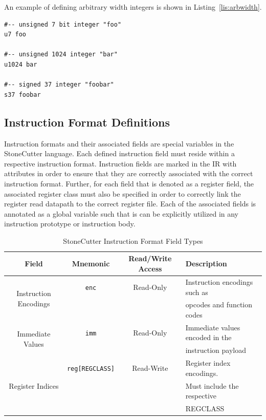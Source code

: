 \documentclass{article}
\begin{document}
An example of defining arbitrary width integers is shown in Listing~\ref{lis:arbwidth}.  

\vspace{0.125in}
\begin{lstlisting}[frame=single,style=base,caption={Arbitrary Width Datatypes},captionpos=b,label={lis:arbwidth}]
#-- unsigned 7 bit integer "foo"
u7 foo

#-- unsigned 1024 integer "bar"
u1024 bar

#-- signed 37 integer "foobar"
s37 foobar
\end{lstlisting}

\clearpage
\subsection{Instruction Format Definitions}
\label{sec:InstFormatDef}

Instruction formats and their associated fields are special variables in the StoneCutter language.  Each defined 
instruction field must reside within a respective instruction format.  Instruction fields are marked in the IR with 
attributes in order to ensure that they are correctly associated with the correct instruction format.  Further, for each 
field that is denoted as a register field, the associated register class must also be specified in order to correctly 
link the register read datapath to the correct register file.  Each of the associated fields is annotated as a global 
variable such that is can be explicitly utilized in any instruction prototype or instruction body.  

\begin{table}[h]
\begin{center}
\caption{StoneCutter Instruction Format Field Types}
\vspace{0.125in}
\label{tab:instformatfields}
\begin{tabular}{|c|c|c|l|}
\hline
\textbf{Field} & \textbf{Mnemonic} & \textbf{Read/Write Access} & \textbf{Description}\\
\hline
\multirow{2}{*}{Instruction Encodings} & \texttt{enc} & Read-Only & Instruction encodings such as\\
												  & & & opcodes and function codes\\
\hline
\multirow{2}{*}{Immediate Values} & \texttt{imm} & Read-Only & Immediate values encoded in the\\
											      & & & instruction payload\\
\hline
\multirow{3}{*}{Register Indices} & \texttt{reg[REGCLASS]} & Read-Write & Register index encodings.\\
														& & & Must include the respective\\
														& & & REGCLASS\\
\hline
\end{tabular}
\end{center}
\end{table}
\end{document}
